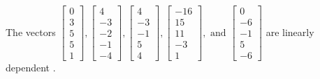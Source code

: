 \begin{exercise}
\begin{exerciseStatement}
  \end{exerciseStatement}
  \begin{exerciseAnswer}
   The vectors \(\left[\begin{array}{r}
0 \\
3 \\
5 \\
5 \\
1
\end{array}\right] , \left[\begin{array}{r}
4 \\
-3 \\
-2 \\
-1 \\
-4
\end{array}\right] , \left[\begin{array}{r}
4 \\
-3 \\
-1 \\
5 \\
4
\end{array}\right] , \left[\begin{array}{r}
-16 \\
15 \\
11 \\
-3 \\
1
\end{array}\right] , \text{ and } \left[\begin{array}{r}
0 \\
-6 \\
-1 \\
5 \\
-6
\end{array}\right]\) are 
  	 linearly dependent  .
  


  \end{exerciseAnswer}
\end{exercise}